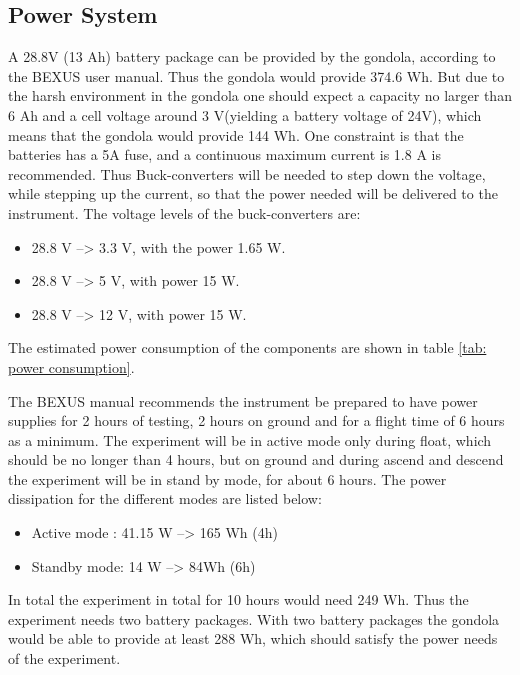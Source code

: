 \pagebreak
\subsection{Power System}

\label{sec:4.7}

A 28.8V (13 Ah) battery package can be provided by the gondola, according to the BEXUS user manual. Thus the gondola would provide 374.6 Wh. But due to the harsh environment in the gondola one should expect a capacity no larger than 6 Ah and a cell voltage around 3 V(yielding a battery voltage of 24V), which means that the gondola would provide 144 Wh. One constraint is that the batteries has a 5A fuse, and a continuous maximum current is 1.8 A is recommended. Thus Buck-converters will be needed to step down the voltage, while stepping up the current, so that the power needed will be delivered to the instrument. The voltage levels of the buck-converters are:

\begin{itemize}
	\item 28.8 V --> 3.3 V, with the power 1.65 W.
	\item 28.8 V --> 5 V, with power 15 W.
	\item 28.8 V --> 12 V, with power 15 W.
\end{itemize}


The estimated power consumption of the components are shown in table \ref{tab: power consumption}.




The BEXUS manual recommends the instrument be prepared to have power supplies for 2 hours of testing, 2 hours on ground and for a flight time of 6 hours as a minimum. The experiment will be in active mode only during float, which should be no longer than 4 hours, but on ground and during ascend and descend the experiment will be in stand by mode, for about 6 hours. The power dissipation for the different modes are listed below:


\begin{itemize}
    \item Active mode : 41.15 W --> 165 Wh (4h) 
    \item Standby mode: 14 W --> 84Wh (6h)
\end{itemize}

In total the experiment in total for 10 hours would need 249 Wh. Thus the experiment needs two battery packages. With two battery packages the gondola would be able to provide at least 288 Wh, which should satisfy the power needs of the experiment.



\raggedbottom
